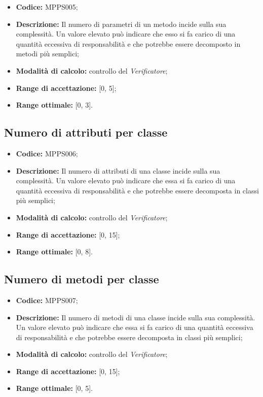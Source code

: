 \documentclass[openany,12pt,a4paper]{report}
\begin{document}
\begin{itemize}
    \item \textbf{Codice:} MPPS005;

    \item \textbf{Descrizione:} Il numero di parametri di un metodo incide sulla sua complessità. Un valore elevato può indicare che esso si fa carico di una quantità eccessiva di responsabilità e che potrebbe essere decomposto in metodi più semplici;
    
    \item \textbf{Modalità di calcolo:} controllo del \textit{Verificatore};
    
    \item \textbf{Range di accettazione:} [0, 5];
    \item \textbf{Range ottimale:} [0, 3].
\end{itemize}

\subsection{Numero di attributi per classe}

\begin{itemize}
    \item \textbf{Codice:} MPPS006;

    \item \textbf{Descrizione:} Il numero di attributi di una classe incide sulla sua complessità. Un valore elevato può indicare che essa si fa carico di una quantità eccessiva di responsabilità e che potrebbe essere decomposta in classi più semplici;
    
    \item \textbf{Modalità di calcolo:} controllo del \textit{Verificatore};
    
    \item \textbf{Range di accettazione:} [0, 15];
    \item \textbf{Range ottimale:} [0, 8].
\end{itemize}

\subsection{Numero di metodi per classe}

\begin{itemize}
    \item \textbf{Codice:} MPPS007;

    \item \textbf{Descrizione:} Il numero di metodi di una classe incide sulla sua complessità. Un valore elevato può indicare che essa si fa carico di una quantità eccessiva di responsabilità e che potrebbe essere decomposta in classi più semplici;
    
    \item \textbf{Modalità di calcolo:} controllo del \textit{Verificatore};
    
    \item \textbf{Range di accettazione:} [0, 15];
    \item \textbf{Range ottimale:} [0, 5].
\end{itemize}
\end{document}
